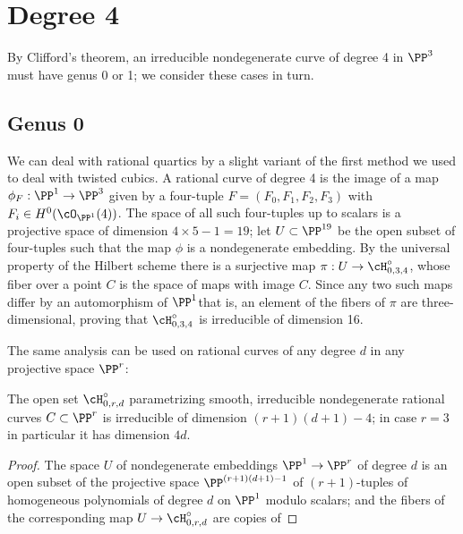 \section{Degree 4}\label{degree 4 genus 0}

By Clifford's theorem, an irreducible nondegenerate curve of degree 4
in $\PP^{3}$ must have genus 0 or 1; we consider these cases in turn.

\subsection*{Genus 0}

We can deal with
rational quartics
%
by a slight variant of the first method
we used to deal with twisted cubics. A rational curve of degree 4 is the
image of a map $\phi_F : \PP^1 \to \PP^3$ given by a four-tuple $F =
(F_0,F_1,F_2,F_3)$ with $F_i \in H^0(\cO_{\PP^1}(4))$. The space of
all such four-tuples up to scalars is a projective space of dimension
$4 \times 5 - 1 = 19$; let $U \subset \PP^{19}$ be the open subset of
four-tuples such that the map $\phi$ is a nondegenerate embedding. By the
universal property of the Hilbert scheme there is a surjective map $\pi :
U \to \cH^\circ_{0,3,4}$, whose fiber over a point $C$ is the space of
maps with image $C$. Since any two such maps differ by an automorphism
%
of $\PP^1$\emdash that is, an element of 
\emdash the fibers of $\pi$ are
three-dimensional, proving that $\cH^\circ_{0,3,4}$ is irreducible of
dimension 16.

The same analysis can be used on rational curves of any degree $d$
in any projective space $\PP^r$:

\begin{proposition}\label{dimension of rational curves}
The open set $\cH^\circ_{0,r,d}$ parametrizing smooth, irreducible
nondegenerate rational curves $C \subset \PP^r$ is irreducible of
dimension $(r+1)(d+1)-4$; in case $r=3$ in particular it has dimension
$4d$.
\end{proposition}

\begin{proof}
The space $U$ of nondegenerate embeddings $\PP^1 \to \PP^r$ of degree
$d$ is an open subset of the projective space $\PP^{(r+1)(d+1)-1}$ of
$(r+1)$-tuples of homogeneous polynomials of degree $d$ on $\PP^1$ modulo
scalars; and the fibers of the corresponding map $U \to \cH^\circ_{0,r,d}$
%
are copies of 
\end{proof}

